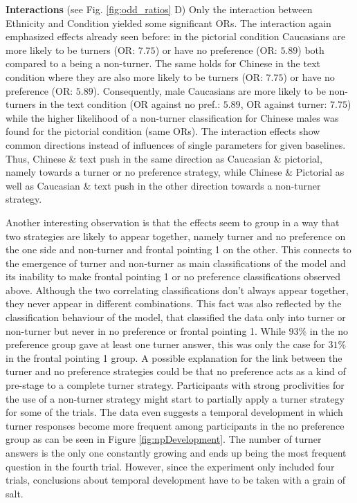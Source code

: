 \documentclass{frontiersSCNS} %
\begin{document}
\textbf{Interactions} (see Fig. \ref{fig:odd_ratios} D)
Only the interaction between Ethnicity and Condition yielded some significant ORs. The interaction again emphasized effects already seen before: in the pictorial condition Caucasians are more likely to be turners (OR: $7.75$) or have no preference (OR: $5.89$) both compared to a being a non-turner. The same holds for Chinese in the text condition where they are also more likely to be turners (OR: $7.75$) or have no preference (OR: $5.89$). Consequently, male Caucasians are more likely to be non-turners in the text condition (OR against no pref.: $5.89$, OR against turner: $7.75$) while the higher likelihood of a non-turner classification for Chinese males was found for the pictorial condition (same ORs). The interaction effects show common directions instead of influences of single parameters for given baselines. Thus, Chinese \& text push in the same direction as Caucasian \& pictorial, namely towards a turner or no preference strategy, while Chinese \& Pictorial as well as Caucasian \& text push in the other direction towards a non-turner strategy.




Another interesting observation is that the effects seem to group in a way that two strategies are likely to appear together, namely turner and no preference on the one side and non-turner and frontal pointing 1 on the other. This connects to the emergence of turner and non-turner as main classifications of the model and its inability to make frontal pointing 1 or no preference classifications observed above. Although the two correlating classifications don't always appear together, they never appear in different combinations. This fact was also reflected by the classification behaviour of the model, that classified the data only into turner or non-turner but never in no preference or frontal pointing 1. While $93\%$ in the no preference group gave at least one turner answer, this was only the case for $31\%$ in the frontal pointing 1 group.
A possible explanation for the link between the turner and no preference strategies could be that no preference acts as a kind of pre-stage to a complete turner strategy. Participants with strong proclivities for the use of a non-turner strategy might start to partially apply a turner strategy for some of the trials.
The data even suggests a temporal development in which turner responses become more frequent among participants in the no preference group as can be seen in Figure \ref{fig:npDevelopment}. The number of turner answers is the only one constantly growing and ends up being the most frequent question in the fourth trial. However, since the experiment only included four trials, conclusions about temporal development have to be taken with a grain of salt.\\
\end{document}
